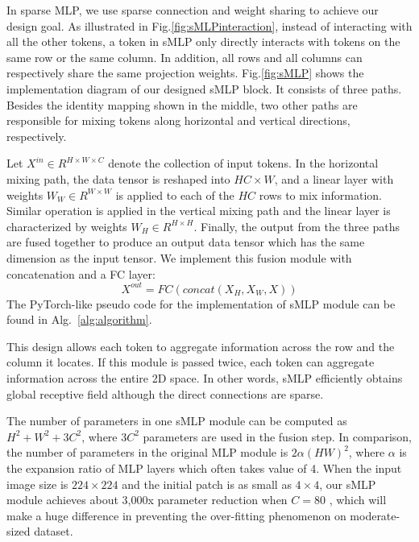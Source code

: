 \documentclass[letterpaper]{article} \usepackage{aaai22}  \usepackage{times}  \usepackage{helvet}  \usepackage{courier}  \usepackage[hyphens]{url}  \usepackage{graphicx} \usepackage{color}
\begin{document}
In sparse MLP, we use sparse connection and weight sharing to achieve our design goal. As illustrated in Fig.\ref{fig:sMLPinteraction}, instead of interacting with all the other tokens, a token in sMLP only directly interacts with tokens on the same row or the same column. In addition, all rows and all columns can respectively share the same projection weights. Fig.\ref{fig:sMLP} shows the implementation diagram of our designed sMLP block. It consists of three paths. Besides the identity mapping shown in the middle, two other paths are responsible for mixing tokens along horizontal and vertical directions, respectively. 

Let $X^{in} \in {R}^{H \times W \times C}$ denote the collection of input tokens. In the horizontal mixing path, the data tensor is reshaped into $HC \times W$, and a linear layer with weights $W_{W} \in {R}^{W \times W}$ is applied to each of the $HC$ rows to mix information. Similar operation is applied in the vertical mixing path and the linear layer is characterized by weights $W_{H} \in {R}^{H \times H}$. Finally, the output from the three paths are fused together to produce an output data tensor which has the same dimension as the input tensor. We implement this fusion module with concatenation and a FC layer:
\begin{equation}
    X^{out} = FC(concat(X_{H},X_{W},X))
\end{equation}
The PyTorch-like pseudo code for the implementation of sMLP module can be found in Alg.~\ref{alg:algorithm}. 




This design allows each token to aggregate information across the row and the column it locates. If this module is passed twice, each token can aggregate information across the entire 2D space. In other words, sMLP efficiently obtains global receptive field although the direct connections are sparse. 

The number of parameters in one sMLP module can be computed as $H^{2} + W ^{2} +3C^{2}$, where $3C^2$ parameters are used in the fusion step. In comparison, the number of parameters in the original MLP module is $2\alpha{(HW)}^{2}$, where $\alpha$ is the expansion ratio of MLP layers which often takes value of 4. When the input image size is $224 \times 224$ and the initial patch is as small as $4 \times 4$, our sMLP module achieves about 3,000x parameter reduction when $C=80$ , which will make a huge difference in preventing the over-fitting phenomenon on moderate-sized dataset. 
\end{document}
